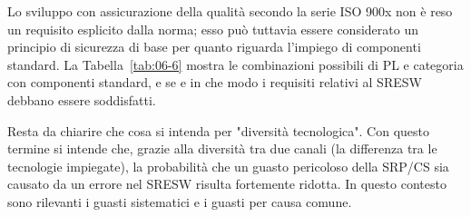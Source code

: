 Lo sviluppo con assicurazione della qualità secondo la serie ISO 900x non è reso un requisito esplicito dalla norma; esso può tuttavia essere considerato un principio di sicurezza di base per quanto riguarda l'impiego di componenti standard.
La Tabella~\ref{tab:06-6} mostra le combinazioni possibili di PL e categoria con componenti standard, e se e in che modo i requisiti relativi al SRESW debbano essere soddisfatti.

Resta da chiarire che cosa si intenda per "diversità tecnologica". Con questo termine si intende che, grazie alla diversità tra due canali (la differenza tra le tecnologie impiegate), la probabilità che un guasto pericoloso della SRP/CS sia causato da un errore nel SRESW risulta fortemente ridotta. In questo contesto sono rilevanti i guasti sistematici e i guasti per causa comune.

